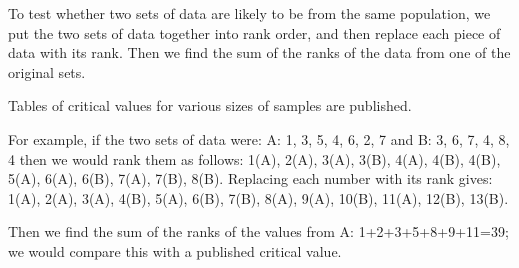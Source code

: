 To test whether two sets of data are likely to be from the same population,
we put the two sets of data together into rank order, and then replace each
piece of data with its rank. Then we find the sum of the ranks of the data
from one of the original sets.
\par
Tables of critical values for various sizes of samples are published.
\par
For example, if the two sets of data were: A: {1, 3, 5, 4, 6, 2, 7} and B: 
{3, 6, 7, 4, 8, 4} then we would rank them as follows: 1(A), 2(A), 3(A), 3(B),
4(A), 4(B), 4(B), 5(A), 6(A), 6(B), 7(A), 7(B), 8(B). Replacing each
number with its rank gives: 1(A), 2(A), 3(A), 4(B), 5(A), 6(B), 7(B), 8(A),
9(A), 10(B), 11(A), 12(B), 13(B).
\par
Then we find the sum of the ranks of the values from A: 1+2+3+5+8+9+11=39;
we would compare this with a published critical value.